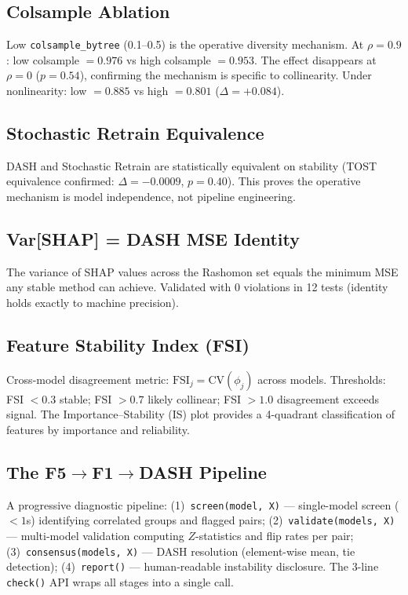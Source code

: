 \documentclass[11pt,a4paper]{article}
\begin{document}
\subsection{Colsample Ablation}

Low \texttt{colsample\_bytree} (0.1--0.5) is the operative diversity mechanism.  At $\rho = 0.9$: low colsample $= 0.976$ vs high colsample $= 0.953$.  The effect disappears at $\rho = 0$ ($p = 0.54$), confirming the mechanism is specific to collinearity.  Under nonlinearity: low $= 0.885$ vs high $= 0.801$ ($\Delta = +0.084$).

\subsection{Stochastic Retrain Equivalence}

DASH and Stochastic Retrain are statistically equivalent on stability (TOST equivalence confirmed: $\Delta = -0.0009$, $p = 0.40$).  This proves the operative mechanism is model independence, not pipeline engineering.

\subsection{Var[SHAP] = DASH MSE Identity}

The variance of SHAP values across the Rashomon set equals the minimum MSE any stable method can achieve.  Validated with 0 violations in 12 tests (identity holds exactly to machine precision).

\subsection{Feature Stability Index (FSI)}

Cross-model disagreement metric: $\mathrm{FSI}_j = \mathrm{CV}(\phi_j)$ across models.  Thresholds: FSI $< 0.3$ stable; FSI $> 0.7$ likely collinear; FSI $> 1.0$ disagreement exceeds signal.  The Importance--Stability (IS) plot provides a 4-quadrant classification of features by importance and reliability.

\subsection{The F5$\to$F1$\to$DASH Pipeline}

A progressive diagnostic pipeline:
(1)~\texttt{screen(model, X)} --- single-model screen ($< 1$s) identifying correlated groups and flagged pairs;
(2)~\texttt{validate(models, X)} --- multi-model validation computing $Z$-statistics and flip rates per pair;
(3)~\texttt{consensus(models, X)} --- DASH resolution (element-wise mean, tie detection);
(4)~\texttt{report()} --- human-readable instability disclosure.
The 3-line \texttt{check()} API wraps all stages into a single call.
\end{document}
